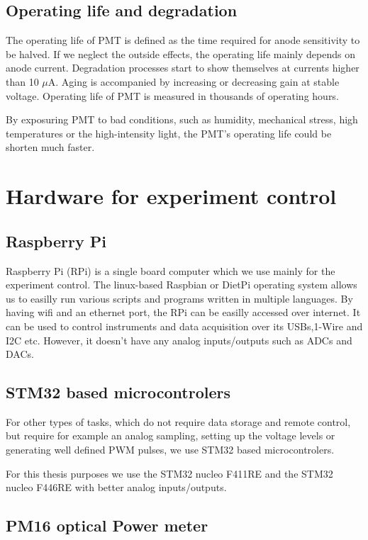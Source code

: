\subsection{Operating life and degradation}
The operating life of PMT is defined as the time required for anode sensitivity to be halved. If we neglect the outside effects, the operating life mainly depends on anode current. 
Degradation processes start to show themselves at currents higher than 10 $\mu$A. Aging is accompanied by increasing or decreasing gain at stable voltage. Operating life of PMT is measured in thousands of operating hours.
\par
By exposuring PMT to bad conditions, such as humidity, mechanical stress, high temperatures or the high-intensity light, the PMT's operating life could be shorten much faster.

\section{Hardware for experiment control}

\subsection{Raspberry Pi}
Raspberry Pi (RPi) is a single board computer which we use mainly for the experiment control. The linux-based Raspbian or DietPi operating system allows us to easilly run various scripts and programs written in multiple languages. By having wifi and an ethernet port, the RPi can be easilly accessed over internet. It can be used to control instruments and data acquisition over its USBs,1-Wire and I2C etc. However, it doesn't have any analog inputs/outputs such as ADCs and DACs.
\subsection{STM32 based microcontrolers}
For other types of tasks, which do not require data storage and remote control, but require for example an analog sampling, setting up the voltage levels or generating well defined PWM pulses, we use STM32 based microcontrolers. 
\par
For this thesis purposes we use the STM32 nucleo F411RE and the STM32 nucleo F446RE with better analog inputs/outputs. 

\subsection{PM16 optical Power meter }

